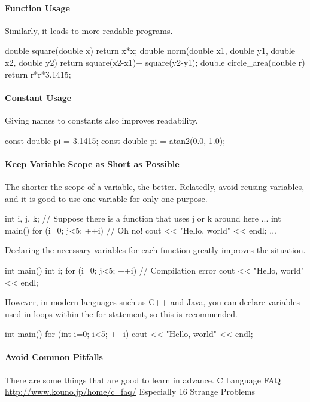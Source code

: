 \paragraph{Function Usage} Similarly, it leads to more readable programs.
  \begin{cbox}
double square(double x) { return x*x; }
double norm(double x1, double y1, double x2, double y2) {
  return square(x2-x1)+ square(y2-y1);
}
double circle_area(double r) { return r*r*3.1415; }\end{cbox}
\paragraph{Constant Usage} Giving names to constants also improves readability.
  \begin{cbox}
const double pi = 3.1415;
const double pi = atan2(0.0,-1.0);    
\end{cbox}
\paragraph{Keep Variable Scope as Short as Possible}
The shorter the scope of a variable, the better. Relatedly, avoid reusing variables, and it is good to use one variable for only one purpose.
\begin{cbox}[emph={j}]
int i, j, k;
// Suppose there is a function that uses j or k around here
...
int main() {
  for (i=0; j<5; ++i) // Oh no!
    cout << "Hello, world" << endl;
  ...
}
\end{cbox}
Declaring the necessary variables for each function greatly improves the situation.
\begin{cbox}
int main() {
  int i;
  for (i=0; j<5; ++i) // Compilation error
    cout << "Hello, world" << endl;
}
\end{cbox}
However, in modern languages such as C++ and Java, you can declare variables used in loops within the for statement, so this is recommended.
\begin{cbox}
int main() {
  for (int i=0; i<5; ++i) 
    cout << "Hello, world" << endl;
}
\end{cbox}
\paragraph{Avoid Common Pitfalls} There are some things that are good to learn in advance.
    C Language FAQ \url{http://www.kouno.jp/home/c_faq/} Especially 16 Strange Problems
